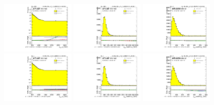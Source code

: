 \begin{figure}[htbp!]
\begin{center}
\includegraphics[angle=270, width=0.32\textwidth]{./figures/boosted/Reweight/Fits/Moriond_bkg_3_NoTag_2Trk_split_subl_Incl_leadHCand_Pt_m_1.pdf}
\includegraphics[angle=270, width=0.32\textwidth]{./figures/boosted/Reweight/Fits/Moriond_bkg_3_NoTag_2Trk_split_subl_Incl_leadHCand_trk0_Pt.pdf}
\includegraphics[angle=270, width=0.32\textwidth]{./figures/boosted/Reweight/Fits/Moriond_bkg_3_NoTag_2Trk_split_subl_Incl_leadHCand_trk1_Pt.pdf} \\
\includegraphics[angle=270, width=0.32\textwidth]{./figures/boosted/Reweight/Fits/Moriond_bkg_9_NoTag_2Trk_split_subl_Incl_leadHCand_Pt_m_1.pdf}
\includegraphics[angle=270, width=0.32\textwidth]{./figures/boosted/Reweight/Fits/Moriond_bkg_9_NoTag_2Trk_split_subl_Incl_leadHCand_trk0_Pt.pdf}
\includegraphics[angle=270, width=0.32\textwidth]{./figures/boosted/Reweight/Fits/Moriond_bkg_9_NoTag_2Trk_split_subl_Incl_leadHCand_trk1_Pt.pdf} \\

\end{center}
\end{figure}
